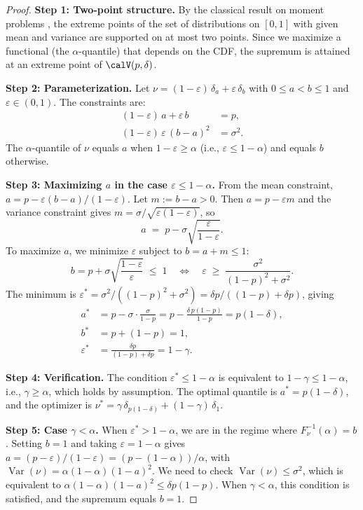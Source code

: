 \documentclass[11pt]{article}
\theoremstyle{definition}
\newcommand{\Var}{\operatorname{Var}}
\newcommand{\1}{\mathbf{1}}
\begin{document}
\begin{proof}
\textbf{Step 1: Two-point structure.} By the classical result on moment problems \citep[Chapter~III]{Karlin1966}, the extreme points of the set of distributions on $[0,1]$ with given mean and variance are supported on at most two points. Since we maximize a functional (the $\alpha$-quantile) that depends on the CDF, the supremum is attained at an extreme point of $\calV(p,\delta)$.

\textbf{Step 2: Parameterization.} Let $\nu = (1-\varepsilon)\,\delta_a + \varepsilon\,\delta_b$ with $0 \leq a < b \leq 1$ and $\varepsilon \in (0,1)$. The constraints are:
\begin{align}
  (1-\varepsilon)\,a + \varepsilon\,b &= p, \label{eq:mean_cst}\\
  (1-\varepsilon)\,\varepsilon\,(b-a)^2 &= \sigma^2. \label{eq:var_cst}
\end{align}
The $\alpha$-quantile of $\nu$ equals $a$ when $1-\varepsilon \geq \alpha$ (i.e., $\varepsilon \leq 1-\alpha$) and equals $b$ otherwise.

\textbf{Step 3: Maximizing $a$ in the case $\varepsilon \leq 1-\alpha$.} From the mean constraint, $a = p - \varepsilon(b-a)/(1-\varepsilon)$. Let $m := b - a > 0$. Then $a = p - \varepsilon m$ and the variance constraint gives $m = \sigma/\sqrt{\varepsilon(1-\varepsilon)}$, so
\[
  a \;=\; p - \sigma\sqrt{\frac{\varepsilon}{1-\varepsilon}}.
\]
To maximize $a$, we minimize $\varepsilon$ subject to $b = a + m \leq 1$:
\[
  b = p + \sigma\sqrt{\frac{1-\varepsilon}{\varepsilon}} \;\leq\; 1
  \quad\Longleftrightarrow\quad
  \varepsilon \;\geq\; \frac{\sigma^2}{(1-p)^2 + \sigma^2}.
\]
The minimum is $\varepsilon^* = \sigma^2/((1-p)^2 + \sigma^2) = \delta p/((1-p) + \delta p)$, giving
\begin{align}
  a^* &= p - \sigma \cdot \frac{\sigma}{1-p} = p - \frac{\delta\,p(1-p)}{1-p} = p(1-\delta), \label{eq:astar}\\
  b^* &= p + (1-p) = 1, \label{eq:bstar}\\
  \varepsilon^* &= \frac{\delta p}{(1-p) + \delta p} = 1 - \gamma. \label{eq:epstar}
\end{align}

\textbf{Step 4: Verification.} The condition $\varepsilon^* \leq 1-\alpha$ is equivalent to $1-\gamma \leq 1-\alpha$, i.e., $\gamma \geq \alpha$, which holds by assumption. The optimal quantile is $a^* = p(1-\delta)$, and the optimizer is $\nu^* = \gamma\,\delta_{p(1-\delta)} + (1-\gamma)\,\delta_1$.

\textbf{Step 5: Case $\gamma < \alpha$.} When $\varepsilon^* > 1-\alpha$, we are in the regime where $F_\nu^{-1}(\alpha) = b$. Setting $b = 1$ and taking $\varepsilon = 1-\alpha$ gives $a = (p-\varepsilon)/(1-\varepsilon) = (p-(1-\alpha))/\alpha$, with $\Var(\nu) = \alpha(1-\alpha)(1-a)^2$. We need to check $\Var(\nu) \leq \sigma^2$, which is equivalent to $\alpha(1-\alpha)(1-a)^2 \leq \delta p(1-p)$. When $\gamma < \alpha$, this condition is satisfied, and the supremum equals $b = 1$.
\end{proof}
\end{document}
